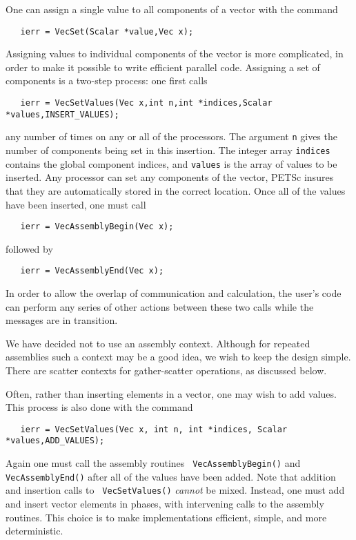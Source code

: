 One can assign a single value to all components of a vector with the 
command 
\begin{verbatim}
   ierr = VecSet(Scalar *value,Vec x);
\end{verbatim}
Assigning values to individual components of the vector is more 
complicated, in order to make it possible to write efficient parallel 
code.  Assigning a set of components is a two-step process: one 
first calls   
\begin{verbatim}
   ierr = VecSetValues(Vec x,int n,int *indices,Scalar *values,INSERT_VALUES);
\end{verbatim}
any number of times on any or all of the processors. The argument
{\tt n} gives the number of components being set in this 
insertion. The integer array {\tt indices} contains the global component
indices, and {\tt values} is the array of values to be inserted.
Any processor can set any components of the vector, PETSc insures that 
they are automatically stored in the correct location.
Once all of the values have been inserted, one must call 
\begin{verbatim}
   ierr = VecAssemblyBegin(Vec x);
\end{verbatim}
followed by  
\begin{verbatim}
   ierr = VecAssemblyEnd(Vec x);
\end{verbatim}
In order to allow the overlap of communication and calculation,
the user's code can perform any series of other actions between these 
two calls while the messages are in transition. 

\begin{design}
We have decided not to use an assembly context.  Although for repeated 
assemblies such a context
 may be a good idea, we wish to keep the design simple.
There are scatter contexts for gather-scatter operations, as discussed below.
\end{design}

Often, rather than inserting elements in a vector, one may wish to 
add values. This process 
is also done with the command 
\begin{verbatim}
   ierr = VecSetValues(Vec x, int n, int *indices, Scalar *values,ADD_VALUES);
\end{verbatim}
Again  one must call the assembly routines {\tt
VecAssemblyBegin()} and {\tt VecAssemblyEnd()} after all of the values
have been added.  Note that addition and insertion calls to {\tt
VecSetValues()} {\em cannot} be mixed.  Instead, one must add and insert
vector elements in phases, with intervening calls to the assembly
routines. This choice is to make implementations efficient, simple,
and more deterministic.

